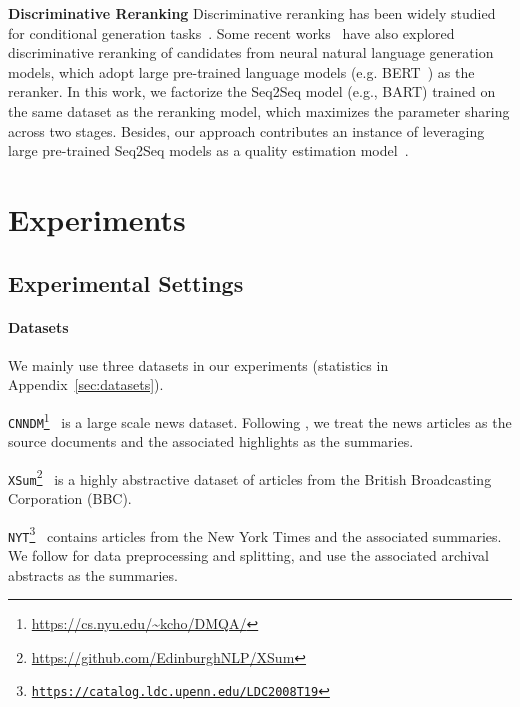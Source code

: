 \documentclass[11pt]{article}
\begin{document}
\noindent \textbf{Discriminative Reranking}
Discriminative reranking has been widely studied for conditional generation tasks~\citep{shen-etal-2004-discriminative, och-etal-2004-smorgasbord,Wan2015MultiDocumentSV, mizumoto-matsumoto-2016-discriminative}.
Some recent works~\citep{liu-liu-2021-simcls, lee-etal-2021-discriminative} have also explored discriminative reranking of candidates from neural natural language generation models, which adopt large pre-trained language models (e.g. BERT~\citep{devlin-etal-2019-bert}) as the reranker.
In this work, we factorize the Seq2Seq model (e.g., BART) trained on the same dataset as the reranking model, which maximizes the parameter sharing across two stages.
Besides, our approach contributes an instance of leveraging large pre-trained Seq2Seq models as a quality estimation model~\citep{yuan2021bartscore}. 


\section{Experiments}

\subsection{Experimental Settings}



\paragraph{Datasets} We mainly use three datasets in our experiments (statistics in Appendix~\ref{sec:datasets}).

\noindent\texttt{CNNDM}\footnote{\url{https://cs.nyu.edu/~kcho/DMQA/}}~\citep{10.5555/2969239.2969428} is a large scale news dataset.
Following \citet{nallapati-etal-2016-abstractive}, we treat the news articles as the source documents and the associated highlights as the summaries.

\noindent\texttt{XSum}\footnote{\url{https://github.com/EdinburghNLP/XSum}}~\citep{narayan-etal-2018-dont} is a highly abstractive dataset of articles from the British Broadcasting Corporation (BBC).

\noindent\texttt{NYT\footnote{\url{https://catalog.ldc.upenn.edu/LDC2008T19}}}~\citep{linguistic2008new}
contains articles from the New York Times and the associated summaries.
We follow \citet{kedzie-etal-2018-content} for data preprocessing and splitting, and use the associated archival abstracts as the summaries. 
\end{document}
